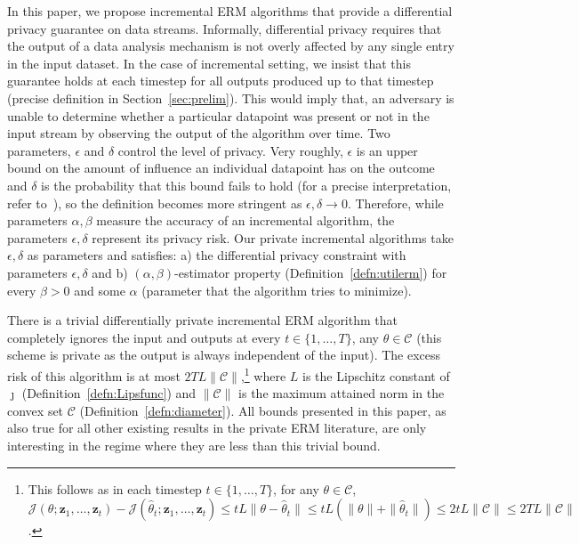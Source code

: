 \documentclass{article}
\theoremstyle{plain}
\def \eps {\epsilon}
\def \z {\mathbf z}
\def \CCC {\mathcal{C}}
\def \JJJ {\mathcal{J}}
\begin{document}
In this paper, we propose incremental ERM algorithms that provide a differential privacy guarantee on data streams. Informally, differential privacy requires that the output of a data analysis mechanism is not overly affected by any single entry in the input dataset. In the case of incremental setting, we insist that this guarantee holds at each timestep for all outputs produced up to that timestep (precise definition in Section~\ref{sec:prelim}). This would imply that, an adversary is unable to determine whether a particular datapoint was present or not in the input stream by observing the output of the algorithm over time. Two parameters, $\eps$ and $\delta$ control the level of privacy. Very roughly, $\eps$ is an upper bound on the amount of influence an individual datapoint has on the outcome and $\delta$ is the probability that this bound fails to hold (for a precise interpretation, refer to~\cite{KS08}), so the definition becomes more stringent as $\eps,\delta \rightarrow 0$. Therefore, while parameters $\alpha,\beta$ measure the accuracy of an incremental algorithm, the parameters $\eps,\delta$ represent its privacy risk. Our private incremental algorithms take $\eps,\delta$ as parameters and satisfies: a) the differential privacy constraint with parameters $\eps,\delta$ and b) $(\alpha,\beta)$-estimator property (Definition~\ref{defn:utilerm}) for every $\beta > 0$ and some $\alpha$ (parameter that the algorithm tries to minimize).

There is a trivial differentially private incremental ERM algorithm that completely ignores the input and outputs at every $t \in \{1,\dots,T\}$, any $\theta \in \CCC$ (this scheme is private as the output is always independent of the input). The excess risk of this algorithm is at most $2 T L \| \CCC \|$,\!\footnote{This follows as in each timestep $t \in \{1,\dots,T\}$, for any $\theta \in \CCC$, $\JJJ(\theta;\z_1,\dots,\z_t)- \JJJ(\hat{\theta}_t;\z_1,\dots,\z_t) \leq t L \| \theta - \hat{\theta}_t \| \leq t L (\|\theta \| + \|\hat{\theta}_t \|) \leq  2 t L \| \CCC\| \leq 2 T L \| \CCC\|$.} where $L$ is the Lipschitz constant of $\jmath$ (Definition~\ref{defn:Lipsfunc}) and $\| \CCC \|$ is the maximum attained norm in the convex set $\CCC$ (Definition~\ref{defn:diameter}). All bounds presented in this paper, as also true for all other existing results in the private ERM literature, are only interesting in the regime where they are less than this trivial bound.
\end{document}
